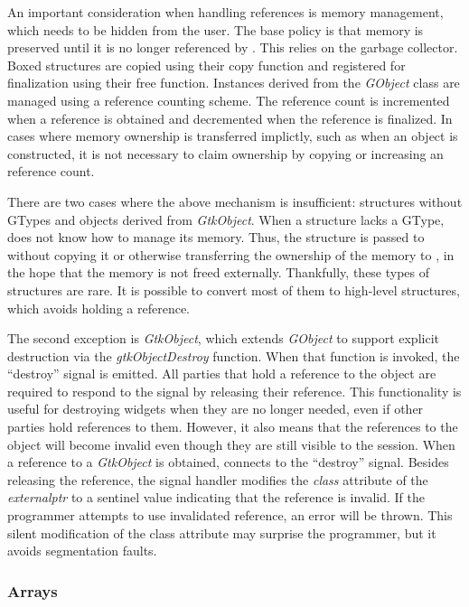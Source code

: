 \documentclass[article]{jss}
\begin{document}
An important consideration when handling references is memory management,
which needs to be hidden from the  user. The base policy is that 
memory is preserved until it is no longer referenced by . This 
relies on the  garbage collector. Boxed structures
are copied using their copy function and registered for finalization
using their free function. Instances derived from the \emph{GObject} class
are managed using a reference counting scheme. The reference count is incremented
when a reference is obtained and decremented when the reference is finalized.
In cases where memory ownership is transferred implictly, such as when an
object is constructed, it is not necessary to claim ownership by copying or
increasing an reference count.

There are two cases where the above mechanism is insufficient:   
structures without GTypes and objects derived from \emph{GtkObject}.
When a structure lacks a GType,  does not know how to manage its memory. 
Thus, the structure is passed to  without copying it or otherwise
transferring the ownership of the memory to , in the hope that the
memory is not freed externally. Thankfully, these types of structures are rare.
It is possible to convert most of them to high-level  structures, 
which avoids holding a reference. 

The second exception is \emph{GtkObject}, which
extends \emph{GObject} to support explicit destruction via the 
\emph{gtkObjectDestroy} function. When that function is invoked, the ``destroy''
signal is emitted. All parties that hold a reference to the object are required
to respond to the signal by releasing their reference. This functionality is 
useful for destroying widgets when they are no longer needed, even if other 
parties hold references to them. However, it also means that the 
references to the object will become invalid even though they are still
visible to the  session. When a reference to a \emph{GtkObject} is
obtained,  connects to the ``destroy'' signal.  Besides releasing
the reference, the signal handler modifies the \emph{class} attribute of the 
\emph{externalptr} to a sentinel value indicating that the reference is invalid.
If the programmer attempts to use invalidated reference, an error will be thrown.
This silent modification of the class attribute may surprise the 
programmer, but it avoids segmentation faults.

\subsubsection{Arrays}
\end{document}

